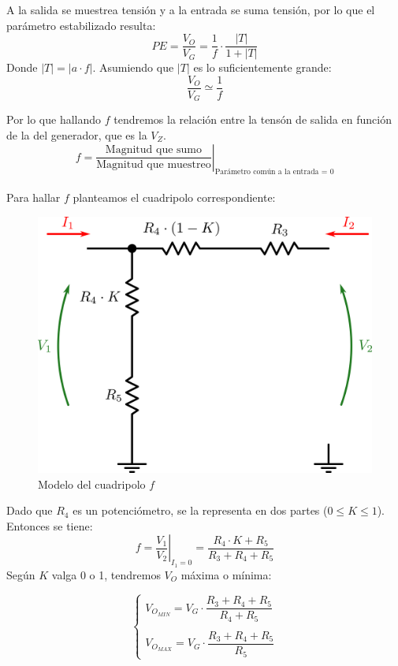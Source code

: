 A la salida se muestrea tensi\'on y a la entrada se suma tensi\'on, por lo que el par\'ametro estabilizado resulta:
\[
PE = \frac{V_O}{V_G} = \frac{1}{f} \cdot \frac{|T|}{1+|T|}
\]
Donde $|T| = |a\cdot f|$. Asumiendo que $|T|$ es lo suficientemente grande:
\[
\frac{V_O}{V_G} \simeq \frac{1}{f}
\]

Por lo que hallando $f$ tendremos la relaci\'on entre la tens\'on de salida en funci\'on de la del generador, que es la $V_Z$.
\[
f = \left. \frac{\textrm{Magnitud que sumo}}{\textrm{Magnitud que muestreo}} \right|_{\textrm{Par\'ametro com\'un a la entrada = 0}}
\]
\\
Para hallar $f$ planteamos el cuadripolo correspondiente:

\begin{figure}[!ht]
\begin{centering}
\includegraphics[scale=0.34]{Imagenes/CuadripoloF.png}
\par\end{centering}
\caption{Modelo del cuadripolo $f$}

\end{figure}

Dado que $R_4$ es un potenci\'ometro, se la representa en dos partes ($0 \leq K \leq 1$). Entonces se tiene:
\[
f = \left. \frac{V_1}{V_2} \right|_{I_1=0} = \frac{R_4 \cdot K + R_5}{R_3 + R_4 + R_5}
\]
Seg\'un $K$ valga 0 o 1, tendremos $V_O$ m\'axima o m\'inima:

\[
\left\lbrace
\begin{array}{l}
V_{O_{MIN}} = V_G \cdot \dfrac{R_3+R_4+R_5}{R_4+R_5}\\ \\
V_{O_{MAX}} = V_G \cdot \dfrac{R_3+R_4+R_5}{R_5}
\end{array}
\right.
\]


